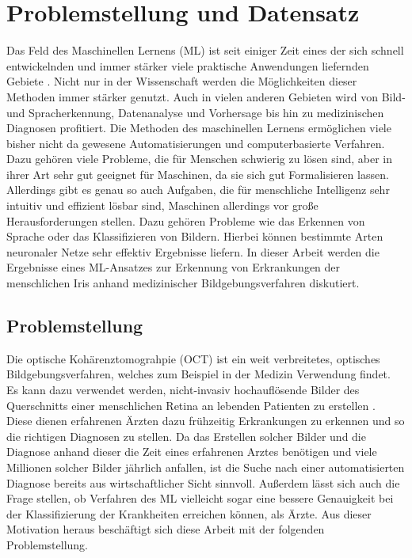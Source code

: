 \chapter{Problemstellung und Datensatz}
\nocite{biblatex, siunitx, scikit-learn, Hunter:2007}%
Das Feld des Maschinellen Lernens (ML) ist seit einiger Zeit eines der sich
schnell entwickelnden und immer stärker viele praktische Anwendungen liefernden
Gebiete \cite{goodfellow}. Nicht nur in der Wissenschaft werden die Möglichkeiten dieser Methoden
immer stärker genutzt. Auch in vielen anderen Gebieten wird von Bild- und
Spracherkennung, Datenanalyse und Vorhersage bis hin zu medizinischen Diagnosen
profitiert. Die Methoden des maschinellen Lernens ermöglichen viele bisher nicht
da gewesene Automatisierungen und computerbasierte Verfahren.
Dazu gehören viele Probleme, die für Menschen schwierig zu lösen sind, aber in
ihrer Art sehr gut geeignet für Maschinen, da sie sich gut Formalisieren lassen.
Allerdings gibt es genau so auch Aufgaben, die für menschliche Intelligenz sehr
intuitiv und effizient lösbar sind, Maschinen allerdings vor große
Herausforderungen stellen. Dazu gehören Probleme wie das Erkennen von Sprache
oder das Klassifizieren von Bildern.
Hierbei können bestimmte Arten neuronaler Netze sehr effektiv Ergebnisse
liefern.
In dieser Arbeit werden die Ergebnisse eines ML-Ansatzes zur Erkennung von
Erkrankungen der menschlichen Iris anhand medizinischer Bildgebungsverfahren
diskutiert.

\section{Problemstellung}

Die optische Kohärenztomograhpie (OCT) ist ein weit verbreitetes, optisches
Bildgebungsverfahren, welches zum Beispiel in der Medizin Verwendung
findet. Es kann dazu verwendet werden, nicht-invasiv hochauflösende
Bilder des Querschnitts einer menschlichen Retina an lebenden Patienten
zu erstellen \cite{paper}.\\
Diese dienen erfahrenen Ärzten dazu frühzeitig Erkrankungen zu erkennen
und so die richtigen Diagnosen zu stellen. Da das Erstellen solcher Bilder
und die Diagnose anhand dieser die Zeit eines erfahrenen Arztes benötigen
und viele Millionen solcher Bilder jährlich anfallen, ist die Suche nach
einer automatisierten Diagnose bereits aus wirtschaftlicher Sicht sinnvoll.
Außerdem lässt sich auch die Frage stellen, ob Verfahren des ML vielleicht
sogar eine bessere Genauigkeit bei der Klassifizierung der Krankheiten erreichen
können, als Ärzte. Aus dieser Motivation heraus beschäftigt sich diese Arbeit  mit der folgenden Problemstellung.
\newline
\noindent{}\\

